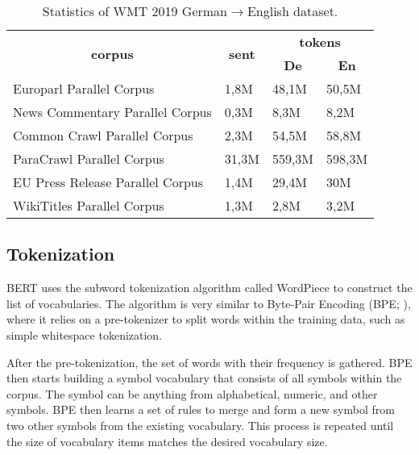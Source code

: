 \begin{table}[h]
    \centering
    \begin{tabular}{@{}llll@{}}
        \toprule
        \multicolumn{1}{c}{\multirow{2}{*}{\textbf{corpus}}} &
        \multicolumn{1}{c}{\multirow{2}{*}{\textbf{sent}}}   &
        \multicolumn{2}{c}{\textbf{tokens}}                                            \\
        \multicolumn{1}{c}{}                                 &
        \multicolumn{1}{c}{}                                 &
        \multicolumn{1}{c}{\textbf{De}}                      &
        \multicolumn{1}{c}{\textbf{En}}                                                \\ \midrule
        Europarl Parallel Corpus                             & 1,8M  & 48,1M  & 50,5M  \\
        News Commentary Parallel Corpus                      & 0,3M  & 8,3M   & 8,2M   \\
        Common Crawl Parallel Corpus                         & 2,3M  & 54,5M  & 58,8M  \\
        ParaCrawl Parallel Corpus                            & 31,3M & 559,3M & 598,3M \\
        EU Press Release Parallel Corpus                     & 1,4M  & 29,4M  & 30M    \\
        WikiTitles Parallel Corpus                           & 1,3M  & 2,8M   & 3,2M   \\ \bottomrule
    \end{tabular}
    \caption{Statistics of WMT 2019 German$\rightarrow$English dataset.}
    \label{tab:wmt19stat}
\end{table}

\subsection{Tokenization}
BERT uses the subword tokenization algorithm called WordPiece  to construct the list of vocabularies. The algorithm is very similar to Byte-Pair Encoding (BPE; \cite{sennrich-etal-2016-neural}), where it relies on a pre-tokenizer to split words within the training data, such as simple whitespace tokenization.

After the pre-tokenization, the set of words with their frequency is gathered. BPE then starts building a symbol vocabulary that consists of all symbols within the corpus. The symbol can be anything from alphabetical, numeric, and other symbols. BPE then learns a set of rules to merge and form a new symbol from two other symbols from the existing vocabulary. This process is repeated until the size of vocabulary items matches the desired vocabulary size.

